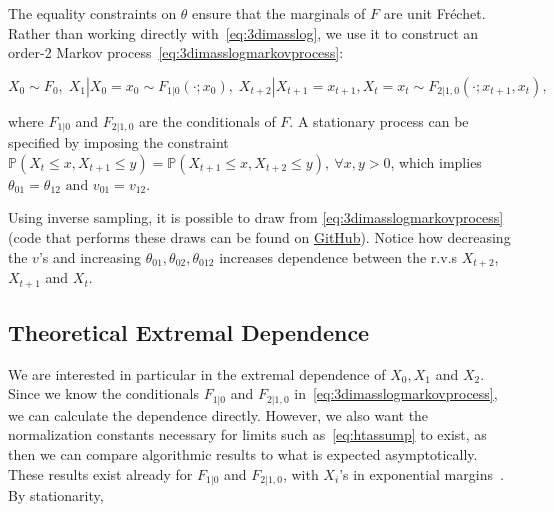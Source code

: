 \documentclass[11pt,twoside,openany]{book}
\newcommand{\p}{\mathbb{P}}
\newcommand{\prob}{\mathbb{P}}
\numberwithin{Theorem}{chapter}
\numberwithin{Definition}{chapter}
\numberwithin{Lemma}{chapter}
\numberwithin{Algorithm}{chapter}
\numberwithin{equation}{chapter}
\begin{document}
The equality constraints on
$\theta$ ensure that the marginals of $F$ are unit
Fréchet.
Rather than working directly with~\eqref{eq:3dimasslog}, we use it to
construct an order-2 Markov process~\eqref{eq:3dimasslogmarkovprocess}:

\begin{equation}\label{eq:3dimasslogmarkovprocess}
  X_{0} \sim F_{0},\;
  X_{1}|X_0=x_0 \sim F_{1|0}(\cdot; x_0),\;
  X_{t+2}|X_{t+1}=x_{t+1},X_t=x_t \sim F_{2|1,0}(\cdot; x_{t+1}, x_t),
\end{equation}

where $F_{1|0}$ and $F_{2|1,0}$ are the conditionals of $F$.
A stationary process can be specified by imposing the constraint
$\prob(X_t \leq x,X_{t+1}\leq y) = \prob(X_{t+1} \leq x,X_{t+2}\leq y),\
\forall x,y>0$, which implies $\theta_{01} = \theta_{12} \text{ and } v_{01} =
v_{12}$.

Using inverse sampling, it is possible to draw from
\eqref{eq:3dimasslogmarkovprocess} (code that performs these draws can be found
on \href{https://github.com/lippirk/edi-diss/asym-log}{GitHub}). Notice how
decreasing the $v$'s and increasing $\theta_{01},\theta_{02},\theta_{012}$
increases dependence between the r.v.s $X_{t+2}$, $X_{t+1}$ and $X_{t}$.









\clearpage

\subsection{Theoretical Extremal Dependence}

We are interested in particular in the extremal dependence of
$X_0,X_1$ and $X_2$. Since we know the conditionals $F_{1|0}$ and
$F_{2|1,0}$ in~\eqref{eq:3dimasslogmarkovprocess}, we can calculate the
dependence directly. However, we also want the normalization constants
necessary for limits such as~\eqref{eq:htassump} to exist, as then we
can compare algorithmic results to what is expected asymptotically.
These results exist already for $F_{1|0}$ and $F_{2|1,0}$, with $X_i$'s in exponential
margins~\citep{papastathopoulos2017extreme,https://doi.org/10.48550/arxiv.1903.04059}. By stationarity,
\end{document}
